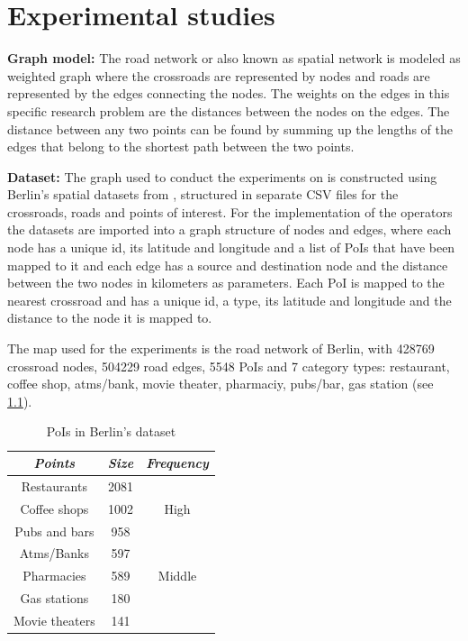 \chapter{Experimental studies}
\label{sec:evaluation}

\textbf{Graph model:}
The road network or also known as spatial network is modeled as weighted graph where the crossroads are represented by nodes and roads are represented by the edges connecting the nodes. The weights on the edges in this specific research problem are the distances between the nodes on the edges. The distance between any two points can be found by summing up the lengths of the edges that belong to the shortest path between the two points.

\textbf{Dataset:}
The graph used to conduct the experiments on is constructed using Berlin's spatial datasets from \cite{datasets}, structured in separate CSV files for the crossroads, roads and points of interest. For the implementation of the operators the datasets are imported into a graph structure of nodes and edges, where each node has a unique id, its latitude and longitude and a list of PoIs that have been mapped to it and each edge has a source and destination node and the distance between the two nodes in kilometers as parameters. Each PoI is mapped to the nearest crossroad and has a unique id, a type, its latitude and longitude and the distance to the node it is mapped to.

The map used for the experiments is the road network of Berlin, with 428769 crossroad nodes, 504229 road edges, 5548 PoIs and 7 category types: restaurant, coffee shop, atms/bank, movie theater, pharmaciy, pubs/bar, gas station (see \ref{dataset}). 

\begin{table}[H]
	\centering
	\begin{tabular}{ |c|c|c| } 
		\hline
		\textit{Points} & \textit{Size} & \textit{Frequency}\\
		\hline
		Restaurants & 2081 & \multirow{3}{3em}{High}\\ 
		Coffee shops & 1002 &\\
		Pubs and bars & 958 &\\  
		\hline
		Atms/Banks & 597 & \multirow{3}{3em}{Middle}\\
		Pharmacies & 589 &\\
		\hline
		Gas stations & 180 & \multirow{3}{3em}{Low}\\
		Movie theaters & 141 &\\ 
		\hline
	\end{tabular}
	\caption{PoIs in Berlin's dataset}
	\label{dataset}
\end{table}

